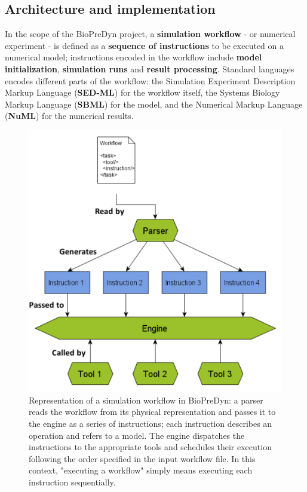 \documentclass[17pt,portrait,a1,usenames,dvipsnames,plainboxedsections]{sciposter}
\begin{document}
\begin{multicols}{2}

\section{Architecture and implementation}
In the scope of the BioPreDyn project, a {\bf simulation workflow} - or
numerical experiment - is defined as a {\bf sequence of instructions} to be
executed on a numerical model; instructions encoded in the workflow include
{\bf model initialization}, {\bf simulation runs} and {\bf result processing}.
Standard languages encodes different parts of the workflow: the Simulation
Experiment Description Markup Language\cite{Kohn2008} ({\bf SED-ML}) for the
workflow itself, the Systems Biology Markup Language\cite{Hucka2003}
({\bf SBML}) for the model, and the Numerical Markup Language ({\bf NuML}) for
the numerical results.

\begin{figure}
\begin{minipage}[c]{0.5\textwidth}
\includegraphics[width=\textwidth]{proposal_complete.pdf}
\end{minipage}\hfill
\begin{minipage}[c]{0.45\textwidth}
\caption{Representation of a simulation workflow in BioPreDyn: a parser reads
the workflow from its physical representation and passes it to the engine as a
series of instructions; each instruction describes an operation and refers to
a model. The engine dispatches the instructions to the appropriate tools and
schedules their execution following the order specified in the input workflow
file. In this context, "executing a workflow" simply means executing each
instruction sequentially.}
\end{minipage}
\end{figure}


\end{multicols}
\end{document}
